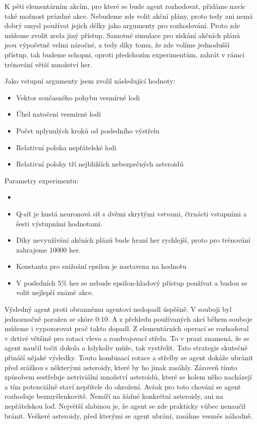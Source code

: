 \par
K pěti elementárním akcím, pro které se bude agent rozhodovat, přidáme navíc také možnost prázdné akce. 
Nebudeme zde volit akční plány, proto tedy ani nemá dobrý smysl používat jejich délky jako argumenty pro rozhodování. Proto zde můžeme zvolit zcela jiný přístup.
Samotné simulace pro získání akčních plánů jsou výpočetně velmi náročné, a tedy díky tomu, že zde volíme jednodušší přístup, tak budeme schopni, oproti předchozím experimentům, zahrát v rámci trénování větší množství her.

\par
Jako vstupní argumenty jsem zvolil následující hodnoty:
\begin{itemize}
    \item Vektor současného pohybu vesmírné lodi
    \item Úhel natočení vesmírné lodi
    \item Počet uplynulých kroků od posledního výstřelu
    \item Relativní poloha nepřátelské lodi
    \item Relativní polohy tří nejbližších nebezpečných asteroidů
\end{itemize}

Parametry experimentu:
\begin{itemize}
    \item {}
    \item Q-síť je hustá neuronová síť s dvěmi skrytými vstvami, čtrnácti vstupními a šesti výstupními hodnotami.
    \item Díky nevyužívání akčních plánů bude hraní her rychlejší, proto pro trénování zahrajeme 10000 her.
    \item Konstanta pro snižoání epsilon je nastavena na hodnotu 
    \item V posledních 5\% her se nebude epsilon-hladový přístup používat a budou se volit nejlepší známé akce.
\end{itemize}


Výsledný agent proti obrannému agentovi nedopadl úspěšně. V souboji byl jednoznačně poražen se skóre 0:10.
A z přehledu používaných akcí během souboje můžeme i vypozorovat proč takto dopadl. Z elementárních operací se rozhodoval v drtivé většině pro rotaci vlevo a rozdvojovací střelu.
To v praxi znamená, že se agent naučil točit dokola a kdykoliv může, tak vystřelit. Tato strategie skutečně přináší nějaké výsledky.
Touto kombinací rotace a střelby se agent dokáže ubránit před srážkou s některými asteroidy, které by ho jinak zasáhly. Zároveň tímto způsobem sestřeluje netriviální množství asteroidů, které se kolem něho nacházejí a tím potenciálně staví nepřítele do ohrožení.
Avšak pro toto chování se agent rozhoduje bezmyšlenkovitě. 
Nemíří na žádné konkrétní asteroidy, ani na nepřátelskou loď.
Největší slabinou je, že agent se zde prakticky vůbec nenaučil bránit.
Veškeré asteroidy, před kterými se agent ubrání, zasáhne vesměs náhodně.


